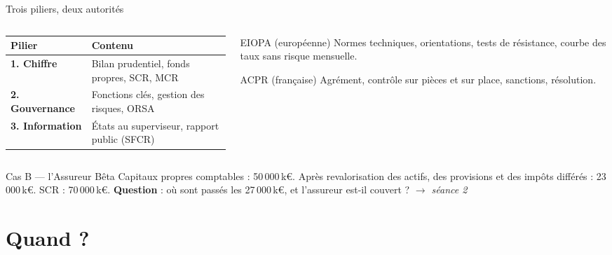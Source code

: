\documentclass[10pt,aspectratio=169]{beamer}
\newcommand{\keur}{\,k\euro}
\newenvironment{cas}[2]{\begin{exampleblock}{Cas #1 --- #2}}{\end{exampleblock}}
\begin{document}
\begin{frame}{Trois piliers, deux autorités}
\begin{columns}[T]
\begin{column}{0.55\textwidth}
\small
\renewcommand{\arraystretch}{1.4}
\begin{tabular}{>{\raggedright\arraybackslash}p{2.4cm}>{\raggedright\arraybackslash}p{4.3cm}}
\toprule
\textbf{Pilier} & \textbf{Contenu} \\
\midrule
\textbf{1. Chiffre} & Bilan prudentiel, fonds propres, SCR, MCR \\
\textbf{2. Gouvernance} & Fonctions clés, gestion des risques, ORSA \\
\textbf{3. Information} & États au superviseur, rapport public (SFCR) \\
\bottomrule
\end{tabular}
\end{column}
\begin{column}{0.42\textwidth}
\begin{block}{EIOPA (européenne)}
\small Normes techniques, orientations, tests de résistance, courbe des taux sans risque mensuelle.
\end{block}
\begin{block}{ACPR (française)}
\small Agrément, contrôle sur pièces et sur place, sanctions, résolution.
\end{block}
\end{column}
\end{columns}
\vspace{0.3cm}
\begin{cas}{B}{l'Assureur Bêta}
Capitaux propres comptables : 50\,000\keur. Après revalorisation des actifs, des provisions et des
impôts différés : 23\,000\keur. SCR : 70\,000\keur. \textbf{Question} : où sont passés les
27\,000\keur, et l'assureur est-il couvert ? \hfill \emph{$\to$ séance 2}
\end{cas}
\end{frame}

\section{Quand ?}
\end{document}
